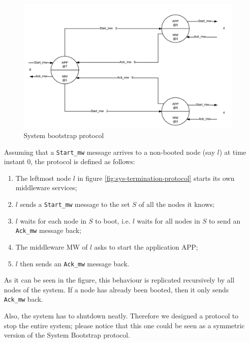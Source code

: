 \begin{figure}[H]
  \centering
  \includegraphics[width=\columnwidth]{sections/images/solution/bootstrap.pdf}
  \caption{System bootstrap protocol}
  \label{fig:sys-bootstrap-protocol}
\end{figure}

Assuming that a \texttt{Start\_mw} message arrives to a non-booted node (say
$l$) at time instant 0, the protocol is defined as follows:

\begin{enumerate}
  \item The leftmost node $l$ in figure \ref{fig:sys-termination-protocol}
    starts its own middleware services;
  \item $l$ sends a \texttt{Start\_mw} message to the set $S$ of all the nodes
    it knows;
  \item $l$ waits for each node in $S$ to boot, i.e. $l$ waits for all nodes
    in $S$ to send an \texttt{Ack\_mw} message back;
  \item The middleware MW of $l$ asks to start the application APP;
  \item $l$ then sends an \texttt{Ack\_mw} message back.
\end{enumerate}

As it can be seen in the figure, this behaviour is replicated recursively
by all nodes of the system. If a node has already been booted, then it only
sends \texttt{Ack\_mw} back.

Also, the system has to shutdown neatly. Therefore we designed a protocol to
stop the entire system; please notice that this one could be seen as a
symmetric version of the System Bootstrap protocol.

